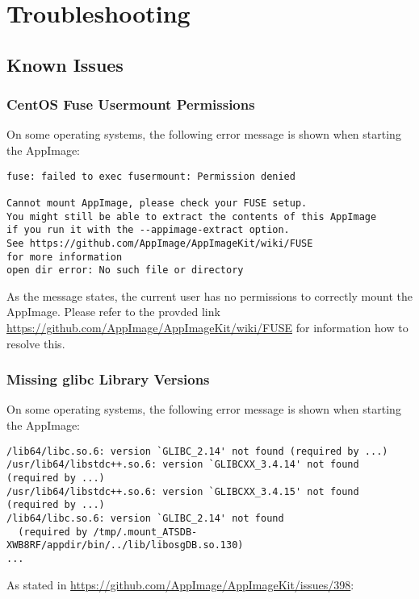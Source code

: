 \chapter{Troubleshooting}
\label{sec:troubleshooting}

\section{Known Issues}

\subsection{CentOS Fuse Usermount Permissions}

On some operating systems, the following error message is shown when starting the AppImage:

\begin{verbatim}
fuse: failed to exec fusermount: Permission denied

Cannot mount AppImage, please check your FUSE setup.
You might still be able to extract the contents of this AppImage 
if you run it with the --appimage-extract option. 
See https://github.com/AppImage/AppImageKit/wiki/FUSE 
for more information
open dir error: No such file or directory
\end{verbatim}


As the message states, the current user has no permissions to correctly mount the AppImage. Please refer to the provded link \url{https://github.com/AppImage/AppImageKit/wiki/FUSE} for information how to resolve this.

\subsection{Missing glibc Library Versions}

On some operating systems, the following error message is shown when starting the AppImage:

\begin{verbatim}
/lib64/libc.so.6: version `GLIBC_2.14' not found (required by ...)
/usr/lib64/libstdc++.so.6: version `GLIBCXX_3.4.14' not found (required by ...)
/usr/lib64/libstdc++.so.6: version `GLIBCXX_3.4.15' not found (required by ...)
/lib64/libc.so.6: version `GLIBC_2.14' not found 
  (required by /tmp/.mount_ATSDB-XWB8RF/appdir/bin/../lib/libosgDB.so.130)
...
\end{verbatim}

As stated in \url{https://github.com/AppImage/AppImageKit/issues/398}:

